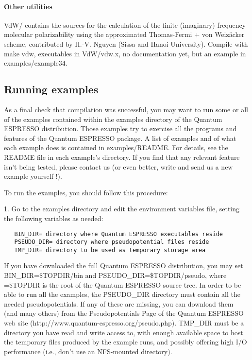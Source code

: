 \documentclass[12pt,a4paper]{article}
\begin{document}
\paragraph{Other utilities}
VdW/ contains the sources for the calculation of the ﬁnite (imaginary)
frequency molecular polarizability using the approximated Thomas-Fermi
+ von Weiz\"acker scheme, contributed by H.-V. Nguyen (Sissa and
Hanoi University). Compile with make vdw, executables in VdW/vdw.x, no
documentation yet, but an example in examples/example34.  

\subsection{Running examples}

As a final check that compilation was successful, you may want to run some or
all of the examples contained within the examples directory of the 
Quantum ESPRESSO distribution. Those examples try to exercise all the programs
and features of the Quantum ESPRESSO package. A list of examples and
of what each example does is contained in examples/README. For details,
see the README ﬁle in each example's directory. If you find that any relevant
feature isn't being tested, please contact us (or even better, write and send
us a new example yourself !).
     
To run the examples, you should follow this procedure:

    
1. Go to the examples directory and edit the environment variables
   file, setting the following variables as needed: 
\begin{verbatim}
   BIN_DIR= directory where Quantum ESPRESSO executables reside
   PSEUDO_DIR= directory where pseudopotential files reside
   TMP_DIR= directory to be used as temporary storage area
\end{verbatim}
If you have downloaded the full Quantum ESPRESSO distribution, you may set 
BIN\_DIR=\$TOPDIR/bin and PSEUDO\_DIR=\$TOPDIR/pseudo, where =\$TOPDIR
is the root of the Quantum ESPRESSO source tree. In order to be able
to run all the examples, the PSEUDO\_DIR directory must contain all the
needed pseudopotentials. 
If any of these are missing, you can download them (and many others)
from the Pseudopotentials Page of the Quantum ESPRESSO web site
(http://www.quantum-espresso.org/pseudo.php). TMP\_DIR must be a
directory you 
have read and write access to, with enough available space to host the
temporary files produced by the example runs, and possibly oﬀering
high I/O performance (i.e., don't use an NFS-mounted directory). 
\end{document}
